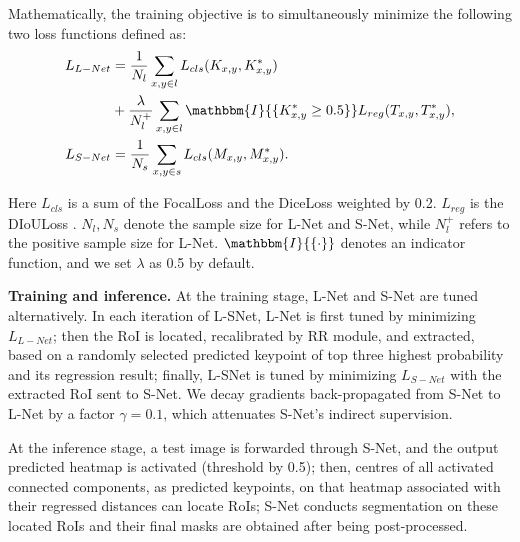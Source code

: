 \documentclass{article}
\begin{document}
Mathematically, the training objective is to simultaneously minimize the following two loss functions defined as:
\vspace{-14pt}
\begin{align}
    L_{L-Net} &= \frac{1}{N_l} \sum_{x,y \in l}{L_{cls}{(K_{x,y}, K_{x,y}^*)}}  \notag \\ 
    & +  \frac{\lambda}{N_l^+} \sum_{x,y \in l}{\mathbbm{I}{\{K_{x,y}^* \geq 0.5\}}L_{reg}{({T}_{x,y}, {T}_{x,y}^*)}} ,\\
    L_{S-Net} &= \frac{1}{N_s} \sum_{x,y \in s}{L_{cls}{(M_{x,y}, M_{x,y}^*)}}.
    \label{loss-l-net}
\end{align}
\vspace{-14pt}

Here $L_{cls}$ is a sum of the FocalLoss \cite{focalloss} and the DiceLoss weighted by 0.2. $L_{reg}$ is the DIoULoss \cite{DIoU}. 
$N_l, N_s$ denote the sample size for L-Net and S-Net, while $N_l^+$ refers to the positive sample size for L-Net.  $\mathbbm{I}{\{\cdot\}}$ denotes an indicator function, and we set $\lambda$ as 0.5 by default. \par

\textbf{Training and inference.}
\label{subsec:training-and-inference}
At the training stage, L-Net and S-Net are tuned alternatively. 
In each iteration of L-SNet, L-Net is first tuned by minimizing $L_{L-Net}$; then the RoI is located, recalibrated by RR module, and extracted, based on a randomly selected predicted keypoint of top three highest probability and its regression result; finally, L-SNet is tuned by minimizing $L_{S-Net}$ with the extracted RoI sent to S-Net. We decay gradients back-propagated from S-Net to L-Net by a factor $\gamma=0.1$, which attenuates S-Net's indirect supervision. \par
At the inference stage, a test image is forwarded through S-Net, and the output predicted heatmap is activated (threshold by 0.5); then, centres of all activated connected components, as predicted keypoints, on that heatmap associated with their regressed distances can locate RoIs; S-Net conducts segmentation on these located RoIs and their final masks are obtained after being post-processed. \par
\end{document}

